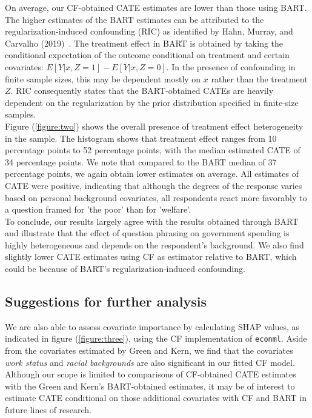 \documentclass[12pt]{article}
\begin{document}
On average, our CF-obtained CATE estimates are lower than those using BART. The
higher estimates of the BART estimates can be attributed to the
regularization-induced confounding (RIC) as identified by Hahn, Murray, and
Carvalho (2019)~\cite{CarvalhoHahnMurray}. The treatment effect in BART is
obtained by taking the conditional expectation of the outcome conditional on
treatment and certain covariates: $E[Y|x,Z = 1] - E[Y|x,Z = 0]$. In the presence
of confounding in finite sample sizes, this may be dependent mostly on $x$
rather than the treatment $Z$. RIC consequently states that the BART-obtained
CATEs are heavily dependent on the regularization by the prior distribution
specified in finite-size samples. \\

Figure (\ref{figure:two}) shows the overall presence of treatment effect heterogeneity in the
sample. The histogram shows that treatment effect ranges from 10 percentage
points to 52 percentage points, with the median estimated CATE of 34 percentage
points. We note that compared to the BART median of 37 percentage points, we
again obtain lower estimates on average. All estimates of CATE were positive,
indicating that although the degrees of the response varies based on personal
background covariates, all respondents react more favorably to a question framed
for 'the poor' than for 'welfare'. \\

To conclude, our results largely agree with the results obtained through BART
and illustrate that the effect of question phrasing on government spending is
highly heterogeneous and depends on the respondent's background. We also find
slightly lower CATE estimates using CF as estimator relative to BART, which
could be because of BART's regularization-induced confounding. \\ 

\subsection{Suggestions for further analysis}
We are also able to assess covariate importance by calculating SHAP values, as
indicated in figure (\ref{figure:three}), using the CF implementation of \texttt{econml}. Aside
from the covariates estimated by Green and Kern, we find that the covariates
\textit{work status} and \textit{racial backgrounds} are also significant in our
fitted CF model. Although our scope is limited to comparisons of CF-obtained
CATE estimates with the Green and Kern's BART-obtained estimates, it may be of
interest to estimate CATE conditional on those additional covariates with CF and
BART in future lines of research. 
\end{document}
